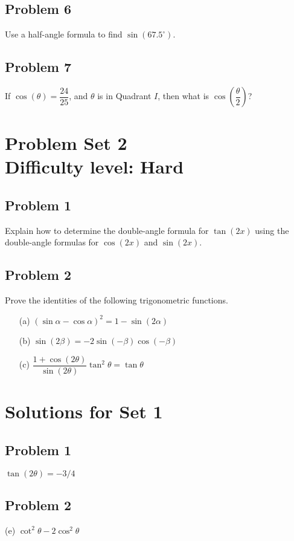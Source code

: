 \documentclass[12pt]{article}
\begin{document}
\subsection*{Problem 6}
Use a half-angle formula to find \(\sin(67.5^\circ)\).

\subsection*{Problem 7}
If \(\cos(\theta)=\dfrac{24}{25}\), and \(\theta\) is in Quadrant \(I\), then what is \(\cos\left(\dfrac{\theta}{2}\right)\)?

\section*{Problem Set 2\\Difficulty level: Hard}
\subsection*{Problem 1}
Explain how to determine the double-angle formula for \(\tan(2x)\) using the double-angle formulas for \(\cos(2x)\) and \(\sin(2x)\).

\subsection*{Problem 2}
Prove the identities of the following trigonometric functions.
\begin{enumerate}
    \item[(a)] \((\sin \alpha-\cos \alpha)^2 = 1 - \sin(2\alpha)\)
    \item[(b)] \(\sin(2\beta) = -2\sin(-\beta)\cos(-\beta)\)
    \item[(c)] \(\dfrac{1+\cos(2\theta)}{\sin(2\theta)}\tan^2\theta = \tan \theta\)
\end{enumerate}

\newpage
\section*{Solutions for Set 1}
\subsection*{Problem 1}
\(\tan(2\theta)=-3/4\)
\subsection*{Problem 2}
(e) \(\cot ^2 \theta -2\cos ^2 \theta\)
\end{document}
